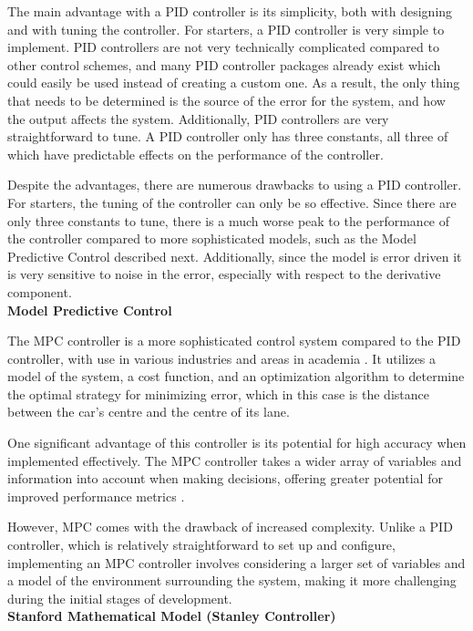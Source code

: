 \documentclass[titlepage, draft]{article}
\begin{document}
{The main advantage with a PID controller is its simplicity, both with designing and with tuning the controller. For starters, a PID controller is very simple to implement. PID controllers are not very technically complicated compared to other control schemes, and many PID controller packages already exist which could easily be used instead of creating a custom one. As a result, the only thing that needs to be determined is the source of the error for the system, and how the output affects the system. Additionally, PID controllers are very straightforward to tune. A PID controller only has three constants, all three of which have predictable effects on the performance of the controller.

Despite the advantages, there are numerous drawbacks to using a PID controller. For starters, the tuning of the controller can only be so effective. Since there are only three constants to tune, there is a much worse peak to the performance of the controller compared to more sophisticated models, such as the Model Predictive Control described next. Additionally, since the model is error driven it is very sensitive to noise in the error, especially with respect to the derivative component.
\\

\textbf{Model Predictive Control}

The MPC controller is a more sophisticated control system compared to the PID controller, with use in various industries and areas in academia \cite{GARCIA1989335}. It utilizes a model of the system, a cost function, and an optimization algorithm to determine the optimal strategy for minimizing error, which in this case is the distance between the car's centre and the centre of its lane.

One significant advantage of this controller is its potential for high accuracy when implemented effectively. The MPC controller takes a wider array of variables and information into account when making decisions, offering greater potential for improved performance metrics \cite{GARCIA1989335}.

However, MPC comes with the drawback of increased complexity. Unlike a PID controller, which is relatively straightforward to set up and configure, implementing an MPC controller involves considering a larger set of variables and a model of the environment surrounding the system, making it more challenging during the initial stages of development.
\\

\textbf{Stanford Mathematical Model (Stanley Controller)}

}
\end{document}
